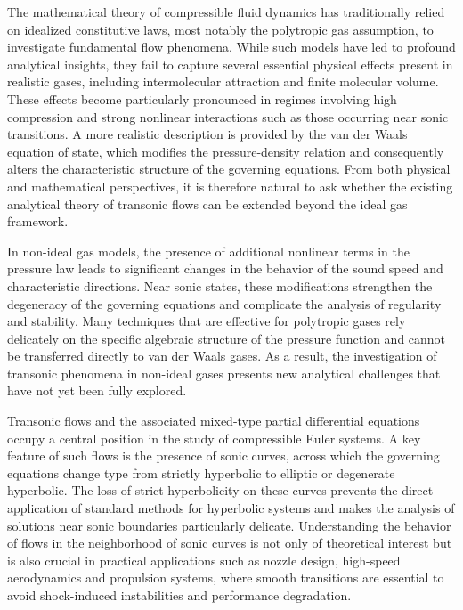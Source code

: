 \documentclass[3p,11pt]{elsarticle}
\numberwithin{equation}{section}
\begin{document}
The mathematical theory of compressible fluid dynamics has traditionally relied on idealized constitutive laws, most notably the polytropic gas assumption, to investigate fundamental flow phenomena. While such models have led to profound analytical insights, they fail to capture several essential physical effects present in realistic gases, including intermolecular attraction and finite molecular volume. These effects become particularly pronounced in regimes involving high compression and strong nonlinear interactions such as those occurring near sonic transitions. A more realistic description is provided by the van der Waals equation of state, which modifies the pressure-density relation and consequently alters the characteristic structure of the governing equations. From both physical and mathematical perspectives, it is therefore natural to ask whether the existing analytical theory of transonic flows can be extended beyond the ideal gas framework.

In non-ideal gas models, the presence of additional nonlinear terms in the pressure law leads to significant changes in the behavior of the sound speed and characteristic directions. Near sonic states, these modifications strengthen the degeneracy of the governing equations and complicate the analysis of regularity and stability. Many techniques that are effective for polytropic gases rely delicately on the specific algebraic structure of the pressure function and cannot be transferred directly to van der Waals gases. As a result, the investigation of transonic phenomena in non-ideal gases presents new analytical challenges that have not yet been fully explored.

Transonic flows and the associated mixed-type partial differential equations occupy a central position in the study of compressible Euler systems. A key feature of such flows is the presence of sonic curves, across which the governing equations change type from strictly hyperbolic to elliptic or degenerate hyperbolic. The loss of strict hyperbolicity on these curves prevents the direct application of standard methods for hyperbolic systems and makes the analysis of solutions near sonic boundaries particularly delicate. Understanding the behavior of flows in the neighborhood of sonic curves is not only of theoretical interest but is also crucial in practical applications such as nozzle design, high-speed aerodynamics and propulsion systems, where smooth transitions are essential to avoid shock-induced instabilities and performance degradation.
\end{document}
